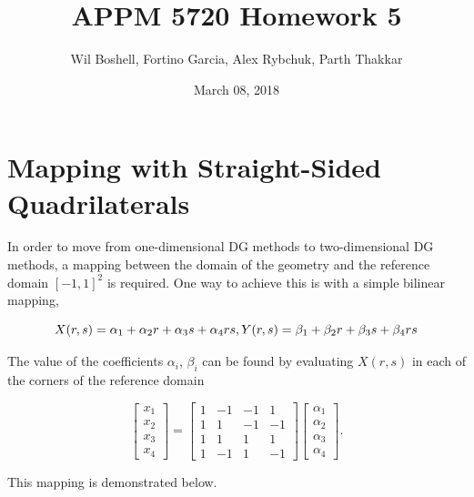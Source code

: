 \documentclass{article}
\title{APPM 5720 Homework 5}
\author{Wil Boshell, Fortino Garcia, Alex Rybchuk, Parth Thakkar}
\date{March 08, 2018}
\begin{document}
\maketitle

\maketitle

\section{Mapping with Straight-Sided Quadrilaterals}
In order to move from one-dimensional DG methods to two-dimensional DG methods, a mapping between the domain of the geometry and the reference domain $[-1,1]^2$ is required. One way to achieve this is with a simple bilinear mapping,

\begin{equation}
X(r,s) = \alpha_1 + \alpha_2r + \alpha_3s + \alpha_4rs, \\
Y(r,s) = \beta_1 + \beta_2r + \beta_3s + \beta_4rs
\end{equation} 

\noindent The value of the coefficients $\alpha_i$, $\beta_i$ can be found by evaluating $X(r,s)$ in each of the corners of the reference domain

\begin{equation}
    \begin{bmatrix}
      x_1 \\
      x_2 \\
      x_3 \\
      x_4 
    \end{bmatrix}
    =     
    \begin{bmatrix}
      1 & -1 & -1 & 1 \\
      1 & 1 & -1 & -1 \\
      1 & 1 & 1 & 1 \\
      1 & -1 & 1 & -1
    \end{bmatrix}
    \begin{bmatrix}
      \alpha_1 \\
      \alpha_2 \\
      \alpha_3 \\
      \alpha_4 
    \end{bmatrix}.
\end{equation}

\noindent This mapping is demonstrated below.
\end{document}
